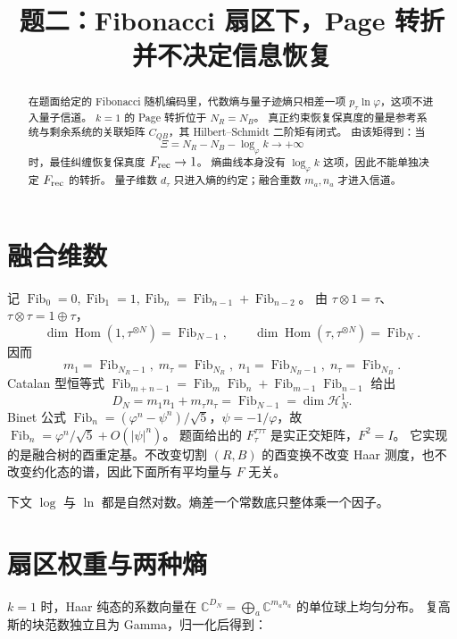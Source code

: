 \documentclass[11pt]{ctexart}
\title{题二：Fibonacci 扇区下，Page 转折并不决定信息恢复}
\author{}
\date{}
\theoremstyle{definition}
\theoremstyle{remark}
\newcommand{\ph}{\varphi}
\begin{document}
\maketitle

\begin{abstract}
在题面给定的 Fibonacci 随机编码里，代数熵与量子迹熵只相差一项 $p_\tau\ln\ph$，这项不进入量子信道。
$k=1$ 的 Page 转折位于 $N_R=N_B$。
真正约束恢复保真度的量是参考系统与剩余系统的关联矩阵 $C_{QB}$，其 Hilbert--Schmidt 二阶矩有闭式。
由该矩得到：当
\[
\Xi=N_R-N_B-\log_{\ph}k\to+\infty
\]
时，最佳纠缠恢复保真度 $F_{\rm rec}\to 1$。
熵曲线本身没有 $\log_{\ph}k$ 这项，因此不能单独决定 $F_{\rm rec}$ 的转折。
量子维数 $d_\tau$ 只进入熵的约定；融合重数 $m_a,n_a$ 才进入信道。
\end{abstract}

\section{融合维数}
记 $\operatorname{Fib}_0=0,\operatorname{Fib}_1=1,\operatorname{Fib}_{n}=\operatorname{Fib}_{n-1}+\operatorname{Fib}_{n-2}$。
由 $\tau\otimes 1=\tau$、$\tau\otimes\tau=1\oplus\tau$，
\[
\dim\operatorname{Hom}(1,\tau^{\otimes N})=\operatorname{Fib}_{N-1},\qquad
\dim\operatorname{Hom}(\tau,\tau^{\otimes N})=\operatorname{Fib}_{N}.
\]
因而
\[
m_1=\operatorname{Fib}_{N_R-1},\;
m_\tau=\operatorname{Fib}_{N_R},\;
n_1=\operatorname{Fib}_{N_B-1},\;
n_\tau=\operatorname{Fib}_{N_B}.
\]
Catalan 型恒等式 $\operatorname{Fib}_{m+n-1}=\operatorname{Fib}_m\operatorname{Fib}_n+\operatorname{Fib}_{m-1}\operatorname{Fib}_{n-1}$ 给出
\[
D_N=m_1n_1+m_\tau n_\tau=\operatorname{Fib}_{N-1}=\dim\mathcal H_N^1.
\]
Binet 公式 $\operatorname{Fib}_n=(\ph^n-\psi^n)/\sqrt5$，$\psi=-1/\ph$，故
$\operatorname{Fib}_n=\ph^n/\sqrt5+O(|\psi|^n)$。
题面给出的 $F^{\tau\tau\tau}_\tau$ 是实正交矩阵，$F^2=I$。
它实现的是融合树的酉重定基。不改变切割 $(R,B)$ 的酉变换不改变 Haar 测度，也不改变约化态的谱，因此下面所有平均量与 $F$ 无关。

下文 $\log$ 与 $\ln$ 都是自然对数。熵差一个常数底只整体乘一个因子。

\section{扇区权重与两种熵}
\label{sec:entropy}

$k=1$ 时，Haar 纯态的系数向量在 $\mathbb C^{D_N}=\bigoplus_a\mathbb C^{m_an_a}$ 的单位球上均匀分布。
复高斯的块范数独立且为 Gamma，归一化后得到：
\end{document}

